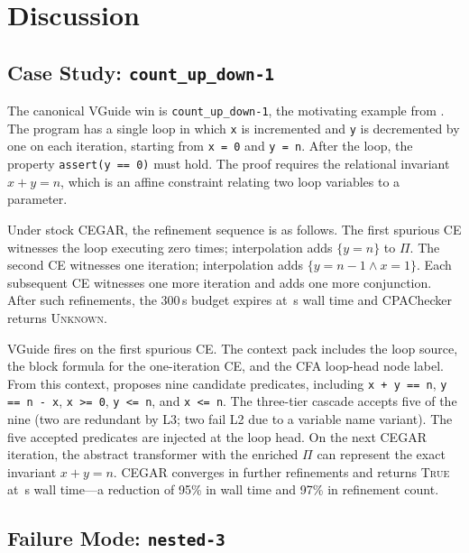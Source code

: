 \section{Discussion}
\label{sec:discussion}

\subsection{Case Study: \texttt{count\_up\_down-1}}

The canonical VGuide win is \texttt{count\_up\_down-1}, the motivating example from
. The program has a single loop in which \texttt{x} is incremented and
\texttt{y} is decremented by one on each iteration, starting from \texttt{x = 0} and
\texttt{y = n}. After the loop, the property \texttt{assert(y == 0)} must hold. The
proof requires the relational invariant $x + y = n$, which is an affine constraint
relating two loop variables to a parameter.

Under stock CEGAR, the refinement sequence is as follows. The first spurious CE
witnesses the loop executing zero times; interpolation adds $\{y = n\}$ to $\Pi$.
The second CE witnesses one iteration; interpolation adds $\{y = n - 1 \wedge x = 1\}$.
Each subsequent CE witnesses one more iteration and adds one more conjunction. After
\CUDStockRefs{} such refinements, the 300\,s budget expires at \CUDStockWall{}\,s wall
time and CPAChecker returns \textsc{Unknown}.

VGuide fires on the first spurious CE. The context pack includes the loop source,
the block formula for the one-iteration CE, and the CFA loop-head node label. From
this context, \LLMName{} proposes nine candidate predicates, including \texttt{x + y == n},
\texttt{y == n - x}, \texttt{x >= 0}, \texttt{y <= n}, and \texttt{x <= n}. The
three-tier cascade accepts five of the nine (two are redundant by L3; two fail L2 due
to a variable name variant). The five accepted predicates are injected at the loop head.
On the next CEGAR iteration, the abstract transformer with the enriched $\Pi$ can
represent the exact invariant $x + y = n$. CEGAR converges in \CUDVGuideRefs{}
further refinements and returns \textsc{True} at \CUDVGuideWall{}\,s wall time---a
reduction of 95\% in wall time and 97\% in refinement count.

\subsection{Failure Mode: \texttt{nested-3}}

